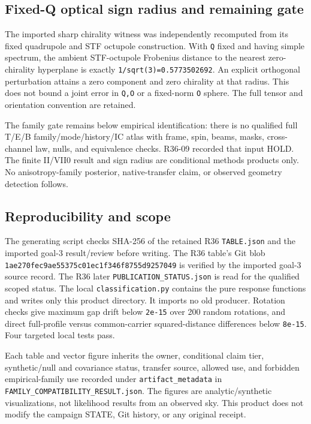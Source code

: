 \documentclass[
]{article}
\begin{document}
\hypertarget{fixed-q-optical-sign-radius-and-remaining-gate}{%
\subsection{Fixed-Q optical sign radius and remaining
gate}\label{fixed-q-optical-sign-radius-and-remaining-gate}}

The imported sharp chirality witness was independently recomputed from
its fixed quadrupole and STF octupole construction. With \texttt{Q}
fixed and having simple spectrum, the ambient STF-octupole Frobenius
distance to the nearest zero-chirality hyperplane is exactly
\texttt{1/sqrt(3)=0.5773502692}. An explicit orthogonal perturbation
attains a zero component and zero chirality at that radius. This does
not bound a joint error in \texttt{Q,O} or a fixed-norm \texttt{O}
sphere. The full tensor and orientation convention are retained.

The family gate remains below empirical identification: there is no
qualified full T/E/B family/mode/history/IC atlas with frame, spin,
beams, masks, cross-channel law, nulls, and equivalence checks. R36-09
recorded that input HOLD. The finite II/VII0 result and sign radius are
conditional methods products only. No anisotropy-family posterior,
native-transfer claim, or observed geometry detection follows.

\hypertarget{reproducibility-and-scope}{%
\subsection{Reproducibility and scope}\label{reproducibility-and-scope}}

The generating script checks SHA-256 of the retained R36
\texttt{TABLE.json} and the imported goal-3 result/review before
writing. The R36 table's Git blob
\texttt{1ae270fec9ae55375c01ec1f346f8755d9257049} is verified by the
imported goal-3 source record. The R36 later
\texttt{PUBLICATION\_STATUS.json} is read for the qualified scoped
status. The local \texttt{classification.py} contains the pure response
functions and writes only this product directory. It imports no old
producer. Rotation checks give maximum gap drift below \texttt{2e-15}
over 200 random rotations, and direct full-profile versus common-carrier
squared-distance differences below \texttt{8e-15}. Four targeted local
tests pass.

Each table and vector figure inherits the owner, conditional claim tier,
synthetic/null and covariance status, transfer source, allowed use, and
forbidden empirical-family use recorded under
\texttt{artifact\_metadata} in
\texttt{FAMILY\_COMPATIBILITY\_RESULT.json}. The figures are
analytic/synthetic visualizations, not likelihood results from an
observed sky. This product does not modify the campaign STATE, Git
history, or any original receipt.
\end{document}

